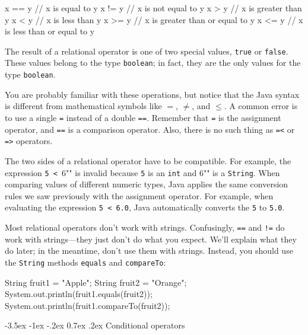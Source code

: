\documentclass[12pt]{book}
\makeatletter
\theoremstyle{exercise}
\newcommand{\java}[1]{\verb"#1"}
\renewcommand{\section}{\@startsection{section}{1}{\z@}%
    {-3.5ex \@plus -1ex \@minus -.2ex}%
    {0.7ex \@plus.2ex}%
    {\normalfont\Large\bfseries}}
\newcommand{\java}[1]{\lstinline{#1}} %
\makeatother
\begin{document}
\begin{code}
    x == y          // x is equal to y
    x != y          // x is not equal to y
    x > y           // x is greater than y
    x < y           // x is less than y
    x >= y          // x is greater than or equal to y
    x <= y          // x is less than or equal to y
\end{code}

The result of a relational operator is one of two special values, \java{true} or \java{false}.
These values belong to the type \java{boolean}; in fact, they are the only values for the type \java{boolean}.

You are probably familiar with these operations, but notice that the Java syntax is different from mathematical symbols like $=$, $\neq$, and $\le$.
A common error is to use a single \java{=} instead of a double \java{==}.
Remember that \java{=} is the assignment operator, and \java{==} is a comparison operator.
Also, there is no such thing as \java{=<} or \java{=>} operators.

The two sides of a relational operator have to be compatible.
For example, the expression \java{5 < "6"} is invalid because \java{5} is an \java{int} and \java{"6"} is a \java{String}.
When comparing values of different numeric types, Java applies the same conversion rules we saw previously with the assignment operator.
For example, when evaluating the expression \java{5 < 6.0}, Java automatically converts the \java{5} to \java{5.0}.

Most relational operators don't work with strings.
Confusingly, \java{==} and \java{!=} do work with strings---they just don't do what you expect.
We'll explain what they do later; in the meantime, don't use them with strings.
Instead, you should use the \java{String} methods \java{equals} and \java{compareTo}:

\begin{code}
    String fruit1 = "Apple";
    String fruit2 = "Orange";
    System.out.println(fruit1.equals(fruit2));
    System.out.println(fruit1.compareTo(fruit2));
\end{code}


\section{Conditional operators}

\end{document}
